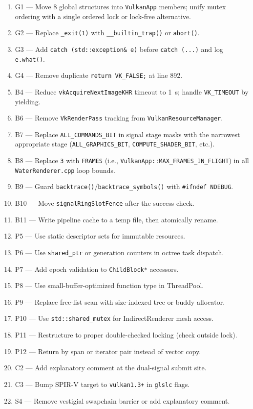 \documentclass[a4paper,12pt]{article}
\begin{document}
\begin{enumerate}[noitemsep]
  \item G1 — Move 8 global structures into \texttt{VulkanApp} members;
        unify mutex ordering with a single ordered lock or lock-free
        alternative.
  \item G2 — Replace \texttt{\_exit(1)} with \texttt{\_\_builtin\_trap()} or
        \texttt{abort()}.
  \item G3 — Add \texttt{catch (std::exception\& e)} before
        \texttt{catch (...)} and log \texttt{e.what()}.
  \item G4 — Remove duplicate \texttt{return VK\_FALSE;} at line 892.
  \item B4 — Reduce \texttt{vkAcquireNextImageKHR} timeout to 1~s; handle
        \texttt{VK\_TIMEOUT} by yielding.
  \item B6 — Remove \texttt{VkRenderPass} tracking from
        \texttt{VulkanResourceManager}.
  \item B7 — Replace \texttt{ALL\_COMMANDS\_BIT} in signal stage masks with
        the narrowest appropriate stage (\texttt{ALL\_GRAPHICS\_BIT},
        \texttt{COMPUTE\_SHADER\_BIT}, etc.).
  \item B8 — Replace \texttt{3} with \texttt{FRAMES} (i.e.,
        \texttt{VulkanApp::MAX\_FRAMES\_IN\_FLIGHT}) in all
        \texttt{WaterRenderer.cpp} loop bounds.
  \item B9 — Guard \texttt{backtrace()}/\texttt{backtrace\_symbols()} with
        \texttt{\#ifndef NDEBUG}.
  \item B10 — Move \texttt{signalRingSlotFence} after the success check.
  \item B11 — Write pipeline cache to a temp file, then atomically rename.
  \item P5 — Use static descriptor sets for immutable resources.
  \item P6 — Use \texttt{shared\_ptr} or generation counters in octree
        task dispatch.
  \item P7 — Add epoch validation to \texttt{ChildBlock*} accessors.
  \item P8 — Use small-buffer-optimized function type in ThreadPool.
  \item P9 — Replace free-list scan with size-indexed tree or buddy allocator.
  \item P10 — Use \texttt{std::shared\_mutex} for IndirectRenderer mesh
        access.
  \item P11 — Restructure to proper double-checked locking (check outside lock).
  \item P12 — Return by span or iterator pair instead of vector copy.
  \item C2 — Add explanatory comment at the dual-signal submit site.
  \item C3 — Bump SPIR-V target to \texttt{vulkan1.3+} in \texttt{glslc} flags.
  \item S4 — Remove vestigial swapchain barrier or add explanatory comment.
\end{enumerate}
\end{document}
